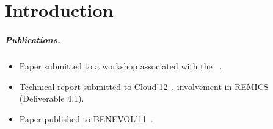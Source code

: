 \chapter{Introduction}


\paragraph{Publications.}

\begin{itemize}
  \item
    Paper submitted to a workshop associated with the ~\cite{ecmfa4clouda}.
  \item
    Technical report submitted to Cloud'12~\cite{remics_4_1}, 
    involvement in REMICS (Deliverable 4.1).
  \item
    Paper published to BENEVOL'11~\cite{mosser-brandtzæg-etal:2011}.
\end{itemize}
